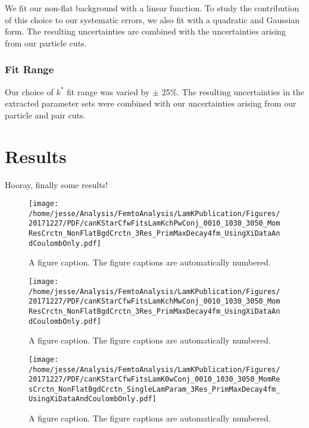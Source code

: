 \documentclass[ALICE,manyauthors]{cernphprep}
\begin{document}
We fit our non-flat background with a linear function.  To study the contribution of this choice to our systematic errors, we also fit with a quadratic and Gaussian form. The resulting uncertainties are combined with the uncertainties arising from our particle cuts.

\subsubsection{Fit Range}
\label{SysErrsLamK0:FitRange}

Our choice of $k^{*}$ fit range was varied by $\pm$ 25\%.  The resulting uncertainties in the extracted parameter sets were combined with our uncertainties arising from our particle and pair cuts.




\section{Results}
\label{sec:Results}
Hooray, finally some results!

\begin{figure}[b]
\texttt{[image: /home/jesse/Analysis/FemtoAnalysis/LamKPublication/Figures/20171227/PDF/canKStarCfwFitsLamKchPwConj\_0010\_1030\_3050\_MomResCrctn\_NonFlatBgdCrctn\_3Res\_PrimMaxDecay4fm\_UsingXiDataAndCoulombOnly.pdf]}%
\caption{\label{fig:epsart} A figure caption. The figure captions are
automatically numbered.}
\end{figure}

\begin{figure}[b]
\texttt{[image: /home/jesse/Analysis/FemtoAnalysis/LamKPublication/Figures/20171227/PDF/canKStarCfwFitsLamKchMwConj\_0010\_1030\_3050\_MomResCrctn\_NonFlatBgdCrctn\_3Res\_PrimMaxDecay4fm\_UsingXiDataAndCoulombOnly.pdf]}%
\caption{\label{fig:epsart} A figure caption. The figure captions are
automatically numbered.}
\end{figure}

\begin{figure}[b]
\texttt{[image: /home/jesse/Analysis/FemtoAnalysis/LamKPublication/Figures/20171227/PDF/canKStarCfwFitsLamK0wConj\_0010\_1030\_3050\_MomResCrctn\_NonFlatBgdCrctn\_SingleLamParam\_3Res\_PrimMaxDecay4fm\_UsingXiDataAndCoulombOnly.pdf]}%
\caption{\label{fig:epsart} A figure caption. The figure captions are
automatically numbered.}
\end{figure}
\end{document}

